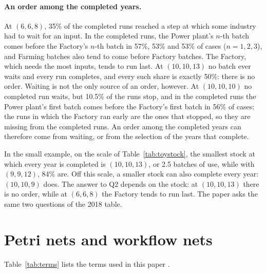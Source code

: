 \documentclass[11pt]{article}
\begin{document}
\paragraph{An order among the completed years.} At $(6,6,8)$, 35\% of the completed runs reached a step at which some industry had to wait for an input. In the completed runs, the Power plant's $n$-th batch comes before the Factory's $n$-th batch in 57\%, 53\% and 53\% of cases ($n=1,2,3$), and Farming batches also tend to come before Factory batches. The Factory, which needs the most inputs, tends to run last. At $(10,10,13)$ no batch ever waits and every run completes, and every such share is exactly 50\%: there is no order. Waiting is not the only source of an order, however. At $(10,10,10)$ no completed run waits, but 10.5\% of the runs stop, and in the completed runs the Power plant's first batch comes before the Factory's first batch in 56\% of cases: the runs in which the Factory ran early are the ones that stopped, so they are missing from the completed runs. An order among the completed years can therefore come from waiting, or from the selection of the years that complete.

In the small example, on the scale of Table~\ref{tab:toystock}, the smallest stock at which every year is completed is $(10,10,13)$, or 2.5 batches of use, while with $(9,9,12)$, 84\% are. Off this scale, a smaller stock can also complete every year: $(10,10,9)$ does. The answer to Q2 depends on the stock: at $(10,10,13)$ there is no order, while at $(6,6,8)$ the Factory tends to run last. The paper asks the same two questions of the 2018 table.

\section{Petri nets and workflow nets}\label{sec:terms}

Table~\ref{tab:terms} lists the terms used in this paper \citep{Murata1989,vanderAalst1997}.
\end{document}
